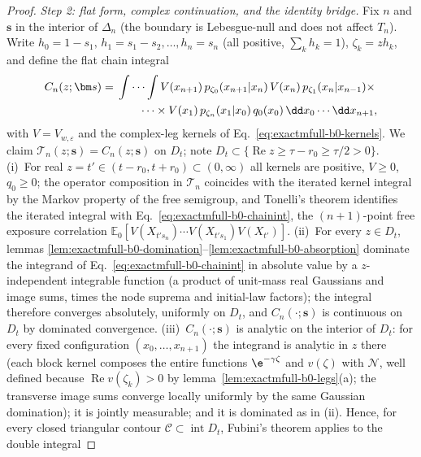 \begin{proof}
\emph{Step 2: flat form, complex continuation, and the identity bridge.}
Fix \(n\) and \(\bm s\) in the interior of \(\Delta_n\) (the boundary is
Lebesgue-null and does not affect \(T_n\)).  Write
\(h_0=1-s_1,\,h_1=s_1-s_2,\ldots,h_n=s_n\) (all positive,
\(\sum_kh_k=1\)), \(\zeta_k=zh_k\), and define the flat chain integral
\begin{equation}
 \begin{split}
 C_n(z;\bm s)
 ={}&\idotsint
 V(x_{n+1})\,p_{\zeta_0}(x_{n+1}|x_n)\,V(x_n)\,
 p_{\zeta_1}(x_n|x_{n-1})\times\\
 &\qquad\cdots\times V(x_1)\,
 p_{\zeta_n}(x_1|x_0)\,q_0(x_0)\,
 \dd x_0\cdots\dd x_{n+1},
 \end{split}
 \label{eq:exactmfull-b0-chainint}
\end{equation}
with \(V=V_{w,\varepsilon}\) and the complex-leg kernels of
Eq.~\eqref{eq:exactmfull-b0-kernels}.  We claim
\(\mathcal T_n(z;\bm s)=C_n(z;\bm s)\) on \(D_t\); note
\(D_t\subset\{\operatorname{Re}z\ge\tau-r_0\ge\tau/2>0\}\).
(i)~For real \(z=t'\in(t-r_0,t+r_0)\subset(0,\infty)\) all kernels are
positive, \(V\ge0\), \(q_0\ge0\); the operator composition in
\(\mathcal T_n\) coincides with the iterated kernel integral by the Markov
property of the free semigroup, and Tonelli's theorem identifies the
iterated integral with Eq.~\eqref{eq:exactmfull-b0-chainint}, the
\((n+1)\)-point free exposure correlation
\(\mathbb E_0[V(X_{t's_n})\cdots V(X_{t's_1})V(X_{t'})]\).
(ii)~For every \(z\in D_t\), lemmas
\ref{lem:exactmfull-b0-domination}--\ref{lem:exactmfull-b0-absorption}
dominate the integrand of Eq.~\eqref{eq:exactmfull-b0-chainint} in absolute
value by a \(z\)-independent integrable function (a product of unit-mass
real Gaussians and image sums, times the node suprema and initial-law
factors); the integral therefore converges absolutely, uniformly on
\(D_t\), and \(C_n(\cdot;\bm s)\) is continuous on \(D_t\) by dominated
convergence.
(iii)~\(C_n(\cdot;\bm s)\) is analytic on the interior of \(D_t\): for
every fixed configuration \((x_0,\ldots,x_{n+1})\) the integrand is
analytic in \(z\) there (each block kernel composes the entire functions
\(\e^{-\gamma\zeta}\) and \(v(\zeta)\) with \(\mathcal N\), well defined
because \(\operatorname{Re}v(\zeta_k)>0\) by
lemma~\ref{lem:exactmfull-b0-legs}(a); the transverse image sums converge
locally uniformly by the same Gaussian domination); it is jointly
measurable; and it is dominated as in (ii).  Hence, for every closed
triangular contour \(\mathcal C\subset\operatorname{int}D_t\), Fubini's
theorem applies to the double integral

\end{proof}
